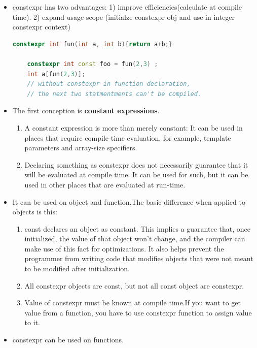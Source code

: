 \documentclass[a4paper,12pt,twoside]{book}
\begin{document}
\begin{itemize}
    \item constexpr has two advantages: 1) improve efficiencies(calculate at compile time). 2) expand usage scope (initialze constexpr obj and use in integer constexpr context)
    \begin{lstlisting}[frame=single, language=c++]
    constexpr int fun(int a, int b){return a+b;}
    
    constexpr int const foo = fun(2,3) ;
    int a[fun(2,3)];
    // without constexpr in function declaration,
    // the next two statmentments can't be compiled. 
    \end{lstlisting}
    \item The first conception is \textbf{constant expressions}. 
    \begin{enumerate}
        \item A constant expression is more than merely constant: It can be used in places that require compile-time evaluation, for example, template parameters and array-size specifiers.
        
        \item Declaring something as constexpr does not necessarily guarantee that it will be evaluated at compile time. It can be used for such, but it can be used in other places that are evaluated at run-time.
    \end{enumerate}

	\item It can be used on object and function.The basic difference when applied to objects is this:
    \begin{enumerate}
        \item const declares an object as constant. This implies a guarantee that, once initialized, the value of that object won't change, and the compiler can make use of this fact for optimizations. It also helps prevent the programmer from writing code that modifies objects that were not meant to be modified after initialization.


        \item All constexpr objects are const, but not all const object are constexpr.
        
        \item Value of constexpr must be known at compile time.If you want to get value from a function, you have to use constexpr function to assign value to it. 
    \end{enumerate}

     \item constexpr can be used on functions.
     

\end{itemize}
\end{document}
